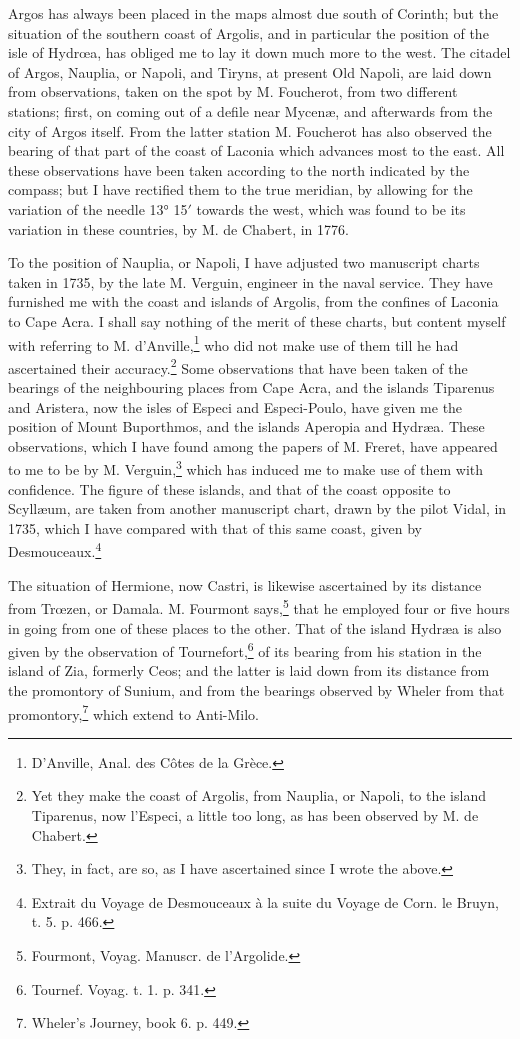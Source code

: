 \documentclass[a4paper, 11pt, oneside, polutonikogreek, english]{article}
\begin{document}
Argos has always been placed in the maps almost due south of Corinth; but the situation of the southern coast of Argolis, and in particular the position of the isle of Hydrœa, has obliged me to lay it down much more to the west. The citadel of Argos, Nauplia, or Napoli, and Tiryns, at present Old Napoli, are laid down from observations, taken on the spot by M. Foucherot, from two different stations; first, on coming out of a defile near Mycenæ, and afterwards from the city of Argos itself. From the latter station M. Foucherot has also observed the bearing of that part of the coast of Laconia which advances most to the east. All these observations have been taken according to the north indicated by the compass; but I have rectified them to the true meridian, by allowing for the variation of the needle 13° 15$'$ towards the west, which was found to be its variation in these countries, by M. de Chabert, in 1776.

To the position of Nauplia, or Napoli, I have adjusted two manuscript charts taken in 1735, by the late M. Verguin, engineer in the naval service. They have furnished me with the coast and islands of Argolis, from the confines of Laconia to Cape Acra. I shall say nothing of the merit of these charts, but content myself with referring to M. d'Anville,\footnote{D'Anville, Anal. des Côtes de la Grèce.} who did not make use of them till he had ascertained their accuracy.\footnote{Yet they make the coast of Argolis, from Nauplia, or Napoli, to the island Tiparenus, now l'Especi, a little too long, as has been observed by M. de Chabert.} Some observations that have been taken of the bearings of the neighbouring places from Cape Acra, and the islands Tiparenus and Aristera, now the isles of Especi and Especi-Poulo, have given me the position of Mount Buporthmos, and the islands Aperopia and Hydræa. These observations, which I have found among the papers of M. Freret, have appeared to me to be by M. Verguin,\footnote{They, in fact, are so, as I have ascertained since I wrote the above.} which has induced me to make use of them with confidence. The figure of these islands, and that of the coast opposite to Scyllæum, are taken from another manuscript chart, drawn by the pilot Vidal, in 1735, which I have compared with that of this same coast, given by Desmouceaux.\footnote{Extrait du Voyage de Desmouceaux à la suite du Voyage de Corn. le Bruyn, t. 5. p. 466.}

The situation of Hermione, now Castri, is likewise ascertained by its distance from Trœzen, or Damala. M. Fourmont says,\footnote{Fourmont, Voyag. Manuscr. de l'Argolide.} that he employed four or five hours in going from one of these places to the other. That of the island Hydræa is also given by the observation of Tournefort,\footnote{Tournef. Voyag. t. 1. p. 341.} of its bearing from his station in the island of Zia, formerly Ceos; and the latter is laid down from its distance from the promontory of Sunium, and from the bearings observed by Wheler from that promontory,\footnote{Wheler's Journey, book 6. p. 449.} which extend to Anti-Milo.
\end{document}
